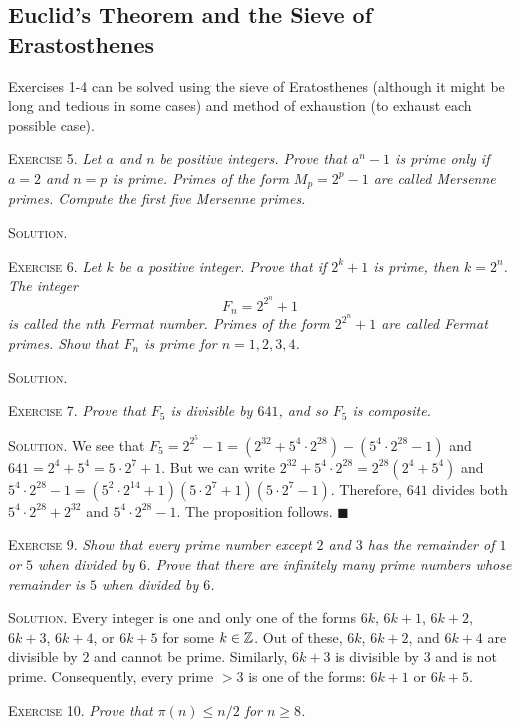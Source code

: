 \documentclass[11pt, leqno]{article}
\newcommand{\done}{\ensuremath{\blacksquare}}
\begin{document}
\subsection{Euclid's Theorem and the Sieve of Erastosthenes}

Exercises 1-4 can be solved using the sieve of Eratosthenes (although it might be long and tedious in some cases) and method of exhaustion (to exhaust each possible case).

\textsc{Exercise 5}. \emph{Let $a$ and $n$ be positive integers. Prove that $a^n-1$ is prime only if $a=2$ and $n=p$ is prime. Primes of the form $M_p = 2^p - 1$ are called Mersenne primes. Compute the first five Mersenne primes.}

\textsc{Solution}.

\textsc{Exercise 6}. \emph{Let $k$ be a positive integer. Prove that if $2^k+1$ is prime, then $k= 2^n$. The integer 
\begin{displaymath}
F_n = 2^{2^n} + 1
\end{displaymath}
is called the nth Fermat number. Primes of the form $2^{2^n}+1$ are called Fermat primes. Show that $F_n$ is prime for $n=1,2,3,4$.}

\textsc{Solution}.

\textsc{Exercise 7}. \emph{Prove that $F_5$ is divisible by $641$, and so $F_5$ is composite.}

\textsc{Solution.} We see that $F_5 = 2^{2^5} - 1 = (2^{32} + 5^4\cdot 2^{28}) - (5^4\cdot 2^{28} - 1)$ and $641 = 2^4 + 5^4 = 5\cdot 2^7 + 1$. But we can write $2^{32} + 5^4\cdot 2^{28} = 2^{28}(2^4 + 5^4)$ and $5^4\cdot 2^{28} - 1 = (5^2\cdot 2^{14} + 1)(5\cdot 2^7 + 1)(5\cdot 2^7 - 1)$. Therefore, $641$ divides both $5^4\cdot 2^{28} + 2^{32}$ and $5^4\cdot 2^{28} - 1$. The proposition follows. \done

\textsc{Exercise 9}. \emph{Show that every prime number except $2$ and $3$ has the remainder of $1$ or $5$ when divided by $6$. Prove that there are infinitely many prime numbers whose remainder is $5$ when divided by $6$.}

\textsc{Solution}. Every integer is one and only one of the forms $6k$, $6k+1$, $6k+2$, $6k+3$, $6k+4$, or $6k+5$ for some $k\in\mathbb{Z}$. Out of these, $6k$, $6k+2$, and $6k+4$ are divisible by $2$ and cannot be prime. Similarly, $6k+3$ is divisible by $3$ and is not prime. Consequently, every prime $>3$ is one of the forms: $6k+1$ or $6k+5$.

\textsc{Exercise 10}. \emph{Prove that $\pi(n) \leq n/2$ for $n\geq 8$.}
\end{document}
